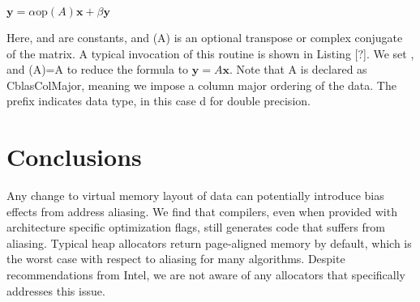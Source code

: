 \documentclass[a4paper,10pt,twocolumn,twoside]{article}
\begin{document}
$\boldsymbol{y}=\alpha\text{op}\left(A\right)\boldsymbol{x}+\beta\boldsymbol{y}$

Here, \alpha and \beta are constants, and \left(A\right) is an optional transpose or complex conjugate of the matrix.
A typical invocation of this routine is shown in Listing [?].
We set ,  and \left(A\right)=A to reduce the formula to $\boldsymbol{y}=A\boldsymbol{x}$.
Note that A is declared as CblasColMajor, meaning we impose a column major ordering of the data.
The prefix indicates data type, in this case d for double precision. 

\fi

\section{Conclusions}
Any change to virtual memory layout of data can potentially introduce bias effects from address aliasing. 
We find that compilers, even when provided with architecture specific optimization flags, still generates code that suffers from aliasing. 
Typical heap allocators return page-aligned memory by default, which is the worst case with respect to aliasing for many algorithms.
Despite recommendations from Intel, we are not aware of any allocators that specifically addresses this issue.





\end{document}
